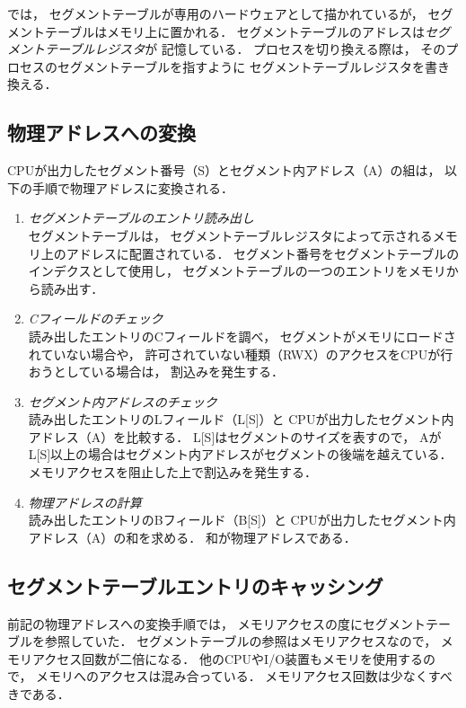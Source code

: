 では，
セグメントテーブルが専用のハードウェアとして描かれているが，
セグメントテーブルはメモリ上に置かれる．
セグメントテーブルのアドレスは\emph{セグメントテーブルレジスタ}が
記憶している．
プロセスを切り換える際は，
そのプロセスのセグメントテーブルを指すように
セグメントテーブルレジスタを書き換える．

\subsection{物理アドレスへの変換}
CPUが出力したセグメント番号（S）とセグメント内アドレス（A）の組は，
以下の手順で物理アドレスに変換される．

\begin{enumerate}
\item \emph{セグメントテーブルのエントリ読み出し}\\
  セグメントテーブルは，
  セグメントテーブルレジスタによって示されるメモリ上のアドレスに配置されている．
  セグメント番号をセグメントテーブルのインデクスとして使用し，
  セグメントテーブルの一つのエントリをメモリから読み出す．

\item \emph{Cフィールドのチェック}\\
  読み出したエントリのCフィールドを調べ，
  セグメントがメモリにロードされていない場合や，
  許可されていない種類（RWX）のアクセスをCPUが行おうとしている場合は，
  割込みを発生する．

\item \emph{セグメント内アドレスのチェック}\\
  読み出したエントリのLフィールド（L[S]）と
  CPUが出力したセグメント内アドレス（A）を比較する．
  L[S]はセグメントのサイズを表すので，
  AがL[S]以上の場合はセグメント内アドレスがセグメントの後端を越えている．
  メモリアクセスを阻止した上で割込みを発生する．

\item \emph{物理アドレスの計算}\\
  読み出したエントリのBフィールド（B[S]）と
  CPUが出力したセグメント内アドレス（A）の和を求める．
  和が物理アドレスである．
\end{enumerate}

\subsection{セグメントテーブルエントリのキャッシング}
前記の物理アドレスへの変換手順では，
メモリアクセスの度にセグメントテーブルを参照していた．
セグメントテーブルの参照はメモリアクセスなので，
メモリアクセス回数が二倍になる．
他のCPUやI/O装置もメモリを使用するので，
メモリへのアクセスは混み合っている．
メモリアクセス回数は少なくすべきである．

